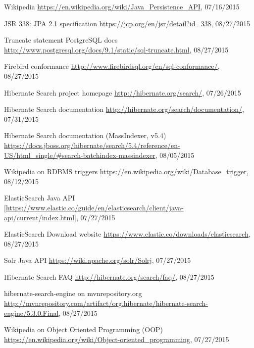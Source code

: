 %
%
\begin{thebibliography}{99}
	Wikipedia
	\url{https://en.wikipedia.org/wiki/Java_Persistence_API}, 07/16/2015
	
	JSR 338: JPA 2.1 specification
	\url{https://jcp.org/en/jsr/detail?id=338}, 08/27/2015
	
	Truncate statement PostgreSQL docs
	\url{http://www.postgresql.org/docs/9.1/static/sql-truncate.html}, 08/27/2015
	
	Firebird conformance
	\url{http://www.firebirdsql.org/en/sql-conformance/}, 08/27/2015
	
	Hibernate Search project homepage
	\url{http://hibernate.org/search/}, 07/26/2015
	
	Hibernate Search documentation
	\url{http://hibernate.org/search/documentation/}, 07/31/2015
	
	Hibernate Search documentation (MassIndexer, v5.4)
	\url{https://docs.jboss.org/hibernate/search/5.4/reference/en-US/html_single/#search-batchindex-massindexer}, 08/05/2015
	
	Wikipedia on RDBMS triggers
	\url{https://en.wikipedia.org/wiki/Database_trigger}, 08/12/2015
	
	ElasticSearch Java API
	\url{[https://www.elastic.co/guide/en/elasticsearch/client/java-api/current/index.html]}, 07/27/2015
	
	ElasticSearch Download website
	\url{https://www.elastic.co/downloads/elasticsearch}, 08/27/2015
	
	Solr Java API
	\url{https://wiki.apache.org/solr/Solrj}, 07/27/2015
	
	Hibernate Search FAQ
	\url{http://hibernate.org/search/faq/}, 08/27/2015
	
	hibernate-search-engine on mvnrepository.org
	\url{http://mvnrepository.com/artifact/org.hibernate/hibernate-search-engine/5.3.0.Final}, 08/27/2015
	
	Wikipedia on Object Oriented Programming (OOP)
	\url{https://en.wikipedia.org/wiki/Object-oriented_programming}, 07/27/2015
	

\end{thebibliography}
